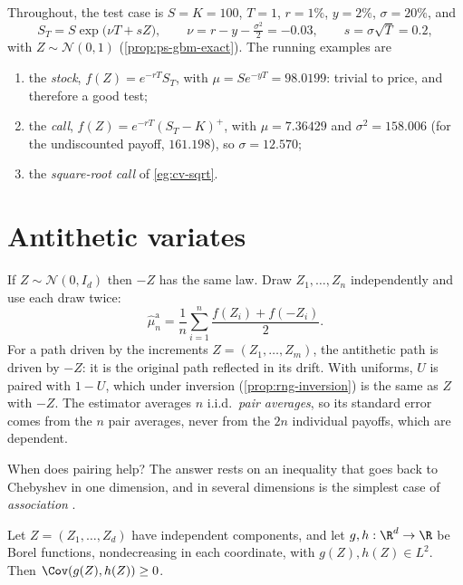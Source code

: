 Throughout, the test case is $S=K=100$, $T=1$, $r=1\%$, $y=2\%$, $\sigma=20\%$, and
\[
  S_T=S\exp\big(\nu T+s Z\big),\qquad \nu=r-y-\tfrac{\sigma^2}{2}=-0.03,\qquad s=\sigma\sqrt T=0.2,
\]
with $Z\sim\mathcal N(0,1)$ (\cref{prop:ps-gbm-exact}). The running examples are
\begin{enumerate}[label=(\alph*)]
  \item the \emph{stock}, $f(Z)=e^{-rT}S_T$, with $\mu=Se^{-yT}=98.0199$: trivial to
    price, and therefore a good test;
  \item the \emph{call}, $f(Z)=e^{-rT}(S_T-K)^+$, with $\mu=7.36429$ and
    $\sigma^2=158.006$ (for the undiscounted payoff, $161.198$), so $\sigma=12.570$;
  \item the \emph{square-root call} of \cref{eg:cv-sqrt}.
\end{enumerate}

\section{Antithetic variates}\label{sec:cv-antithetic}

If $Z\sim\mathcal N(0,I_d)$ then $-Z$ has the same law. Draw $Z_1,\dots,Z_n$ independently
and use each draw twice:
\begin{equation}\label{eq:cv-antithetic}
  \hat\mu^{\mathrm a}_n=\frac1n\sum_{i=1}^n\frac{f(Z_i)+f(-Z_i)}{2}.
\end{equation}
For a path driven by the increments $Z=(Z_1,\dots,Z_m)$, the antithetic path is driven by
$-Z$: it is the original path reflected in its drift. With uniforms, $U$ is paired with
$1-U$, which under inversion (\cref{prop:rng-inversion}) is the same as $Z$ with $-Z$. The
estimator averages $n$ i.i.d.\ \emph{pair averages}, so its standard error comes from the
$n$ pair averages, never from the $2n$ individual payoffs, which are dependent.

When does pairing help? The answer rests on an inequality that goes back to Chebyshev in
one dimension, and in several dimensions is the simplest case of \emph{association}
\citep{esary-proschan-walkup}.

\begin{lemma}\label{lem:cv-association}
Let $Z=(Z_1,\dots,Z_d)$ have independent components, and let $g,h:\R^d\to\R$ be Borel
functions, nondecreasing in each coordinate, with $g(Z),h(Z)\in L^2$. Then $\Cov(g(Z),h(Z))\ge0$.
\end{lemma}

